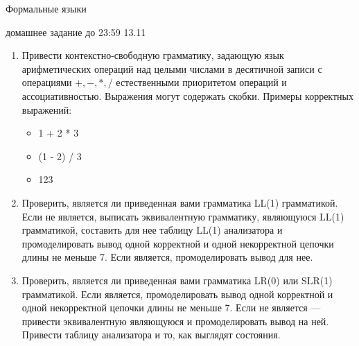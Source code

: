 \documentclass[12pt]{article}
\begin{document}
\begin{center} {\LARGE Формальные языки} \end{center}

\begin{center} \Large домашнее задание до 23:59 13.11 \end{center}
\bigskip

\begin{enumerate}
  \item Привести контекстно-свободную грамматику, задающую язык арифметических операций над целыми числами в десятичной записи с операциями $+, -, *, /$ естественными приоритетом операций и ассоциативностью. Выражения могут содержать скобки. Примеры корректных выражений:
  \begin{itemize}
    \item 1 + 2 * 3
    \item (1 - 2) / 3 
    \item 123 
  \end{itemize}
  \item Проверить, является ли приведенная вами грамматика LL(1) грамматикой. Если не является, выписать эквивалентную грамматику, являющуюся LL(1) грамматикой, составить для нее таблицу LL(1) анализатора и промоделировать вывод одной корректной и одной некорректной цепочки длины не меньше 7. Если является, промоделировать вывод для нее. 
  \item Проверить, является ли приведенная вами грамматика LR(0) или SLR(1) грамматикой. Если является, промоделировать вывод одной корректной и одной некорректной цепочки длины не меньше 7. Если не является  --- привести эквивалентную являющуюся и промоделировать вывод на ней. Привести таблицу анализатора и то, как выглядят состояния. 
  \end{enumerate}
\end{document}
